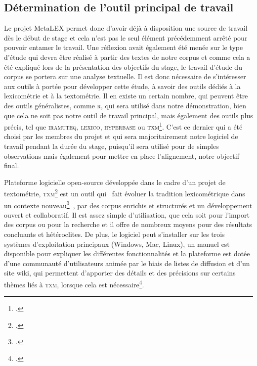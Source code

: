 \subsection{Détermination de l'outil principal de travail}
Le projet MetaLEX permet donc d'avoir déjà à disposition une source de travail dès le début de stage et cela n'est pas le seul élément précédemment arrêté pour pouvoir entamer le travail. Une réflexion avait également été menée sur le type d'étude qui devra être réalisé à partir des textes de notre corpus et comme cela a été expliqué lors de la présentation des objectifs du stage, le travail d'étude du corpus se portera sur une analyse textuelle. Il est donc nécessaire de s'intéresser aux outils à portée pour développer cette étude, à savoir des outils dédiés à la lexicométrie et à la textométrie. Il en existe un certain nombre, qui peuvent être des outils généralistes, comme \textsc{r}, qui sera utilisé dans notre démonstration, bien que cela ne soit pas notre outil de travail principal, mais également des outils plus précis, tel que \textsc{iramuteq}, \textsc{lexico}, \textsc{hyperbase} ou \textsc{txm}\footcite{explorer_corpus_textuel}. C'est ce dernier qui a été choisi par les membres du projet et qui sera majoritairement notre logiciel de travail pendant la durée du stage, puisqu'il sera utilisé pour de simples observations mais également pour mettre en place l'alignement, notre objectif final.

Plateforme logicielle open-source développée dans le cadre d'un projet de textométrie, \textsc{txm}\footcite{txm_plateforme} est un outil qui \og~fait évoluer la tradition lexicométrique dans un contexte nouveau\footcite[p.~219]{explorer_corpus_textuel}~\fg{},  par des corpus enrichis et structurés et un développement ouvert et collaboratif. Il est assez simple d'utilisation, que cela soit pour l'import des corpus ou pour la recherche et il offre de nombreux moyens pour des résultats concluants et hétéroclites. De plus, le logiciel peut s'installer sur les trois systèmes d'exploitation principaux (Windows, Mac, Linux), un manuel est disponible pour expliquer les différentes fonctionnalités et la plateforme est dotée d'une communauté d'utilisateurs animée par le biais de listes de diffusion et d'un site wiki, qui permettent d'apporter des détails et des précisions sur certains thèmes liés à \textsc{txm}, lorsque cela est nécessaire\footcite[p.~219-220]{explorer_corpus_textuel}.


